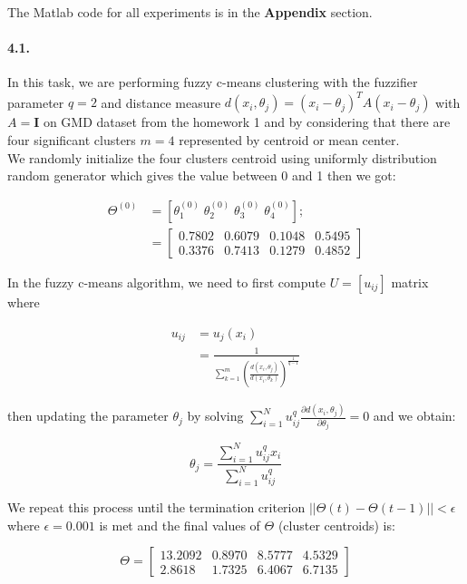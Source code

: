 \documentclass[a4paper]{article}
\begin{document}
\setcounter{page}{6}

\noindent The Matlab code for all experiments is in the \textbf{Appendix} section.

\paragraph{4.1.} In this task, we are performing fuzzy c-means clustering with the fuzzifier parameter $q=2$ and distance measure $d(x_i, \theta_j) = (x_i-\theta_j)^TA(x_i-\theta_j)$ with $A=\mathbf{I}$ on GMD dataset from the homework 1 and by considering that there are four significant clusters $m=4$ represented by centroid or mean center.\\

	We randomly initialize the four clusters centroid using uniformly distribution random generator which gives the value between 0 and 1 then we got:

	\begin{align}
		\Theta^{(0)} &= [\theta_1^{(0)} \; \theta_2^{(0)} \; \theta_3^{(0)} \; \theta_4^{(0)}]; \\
			&= \begin{bmatrix}
				0.7802  &  0.6079  &  0.1048  &  0.5495 \\
    			0.3376  &  0.7413  &  0.1279  &  0.4852
			\end{bmatrix}
	\end{align}

	In the fuzzy c-means algorithm, we need to first compute $U = [u_{ij}]$ matrix where

	\begin{align}
		u_{ij} &= u_j(x_i) \\
			&= \frac{1}{\sum_{k=1}^m (\frac{d(x_i,\theta_j)}{d(x_i,\theta_k)})^{\frac{1}{q-1}}}
	\end{align}

	then updating the parameter $\theta_j$ by solving $\sum_{i=1}^N u_{ij}^q \frac{\partial d(x_i,\theta_j)}{\partial \theta_j} = 0$ and we obtain:

	\begin{equation}
		\theta_j = \frac{\sum_{i=1}^N u_{ij}^qx_i}{\sum_{i=1}^N u_{ij}^q}
	\end{equation}

	We repeat this process until the termination criterion $||\Theta(t)-\Theta(t-1)|| < \epsilon$ where $\epsilon = 0.001$ is met and the final values of $\Theta$ (cluster centroids) is:

	\begin{equation}
		\Theta = \begin{bmatrix}
					13.2092  &  0.8970  &  8.5777  &  4.5329 \\
    				2.8618  &  1.7325  &  6.4067  &  6.7135
				\end{bmatrix}
	\end{equation}
\end{document}
